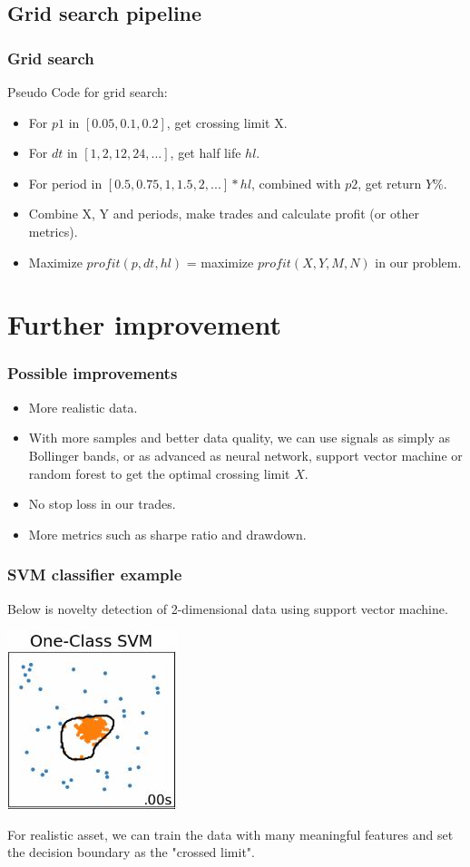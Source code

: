 \documentclass[11pt]{beamer}
\begin{document}
\subsection*{Grid search pipeline}
\frametitle{Grid search}
\begin{frame}
Pseudo Code for grid search:
\begin{itemize}
	\item For $p1$ in $[0.05, 0.1, 0.2]$, get crossing limit X.
	\item For $dt$ in $[1, 2, 12, 24, ...]$, get half life $hl$.
	\item For period in $[0.5, 0.75, 1, 1.5, 2, ...]*hl$, combined with $p2$, get return $Y\%$.
	\item Combine X, Y and periods, make trades and calculate profit (or other metrics).
	\item Maximize $profit(p, dt, hl)$ = maximize $profit(X,Y, M, N)$ in our problem.
\end{itemize}
\end{frame}

\section*{Further improvement}
\begin{frame}
\frametitle{Possible improvements}
\begin{itemize}
	\item More realistic data.
	\item With more samples and better data quality, we can use signals as simply as Bollinger bands, or as advanced as neural network, support vector machine or random forest to get the optimal crossing limit $X$.
	\item No stop loss in our trades.
	\item More metrics such as sharpe ratio and drawdown.
\end{itemize}
\end{frame}

\begin{frame}
\frametitle{SVM classifier example}
Below is novelty detection of 2-dimensional data using support vector machine.
\begin{center}
	\noindent\includegraphics[scale=0.7]{../images/svm.jpg}
\end{center}
For realistic asset, we can train the data with many meaningful features and set the decision boundary as the "crossed limit".

\end{frame}
\end{document}
